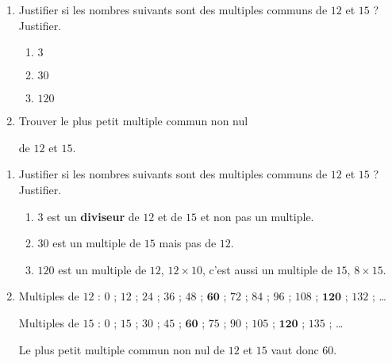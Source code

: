 \begin{exercice*}
    \begin{enumerate}
        \item Justifier si les nombres suivants sont des multiples communs de $12$ et $15$ ? Justifier.
        \begin{enumerate}
            \item $3$
            \item $30$
            \item $120$
        \end{enumerate}
        \item Trouver le plus petit multiple commun non nul 
        
        de $12$ et $15$.
    \end{enumerate}
\end{exercice*}
\begin{corrige}
    \begin{enumerate}
        \item Justifier si les nombres suivants sont des multiples communs de $12$ et $15$ ? Justifier.
        \begin{enumerate}
            \item $3$ est un \textbf{diviseur} de $12$ et de $15$ et non pas un multiple.
            \item $30$ est un multiple de $15$ mais pas de $12$.
            \item $120$ est un multiple de $12$, $12\times 10$, c'est aussi un multiple de $15$, $8\times 15$.
        \end{enumerate}
        \item Multiples de $12$ : \sout{$0$} ; $12$ ; $24$ ; $36$ ; $48$ ; $\mathbf{60}$ ; $72$ ; $84$ ; $96$ ; $108$ ; $\mathbf{120}$ ; $132$ ; \dots
        
        Multiples de $15$ : \sout{$0$} ; $15$ ; $30$ ; $45$ ; $\mathbf{60}$ ; $75$ ; $90$ ; $105$ ; $\mathbf{120}$ ; $135$ ; \dots

        Le plus petit multiple commun non nul de $12$ et $15$ vaut donc $60$.
    \end{enumerate}
\end{corrige}

